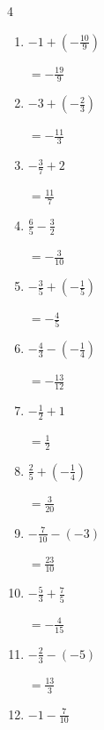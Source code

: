 \begin{multicols}{4}
\begin{enumerate}
        $\displaystyle =\frac{13}{4}$

  \item $\displaystyle -1 + \left(-\frac{10}{9}\right)$

        $\displaystyle =-\frac{19}{9}$

  \item $\displaystyle -3 + \left(-\frac{2}{3}\right)$

        $\displaystyle =-\frac{11}{3}$

  \item $\displaystyle -\frac{3}{7} + 2$

        $\displaystyle =\frac{11}{7}$

  \item $\displaystyle \frac{6}{5} - \frac{3}{2}$

        $\displaystyle =-\frac{3}{10}$

  \item $\displaystyle -\frac{3}{5} + \left(-\frac{1}{5}\right)$

        $\displaystyle =-\frac{4}{5}$

\columnbreak %

  \item $\displaystyle -\frac{4}{3} - \left(-\frac{1}{4}\right)$

        $\displaystyle =-\frac{13}{12}$

  \item $\displaystyle -\frac{1}{2} + 1$

        $\displaystyle =\frac{1}{2}$

  \item $\displaystyle \frac{2}{5} + \left(-\frac{1}{4}\right)$

        $\displaystyle =\frac{3}{20}$

  \item $\displaystyle -\frac{7}{10} - \left(-3\right)$

        $\displaystyle =\frac{23}{10}$

  \item $\displaystyle -\frac{5}{3} + \frac{7}{5}$

        $\displaystyle =-\frac{4}{15}$

  \item $\displaystyle -\frac{2}{3} - \left(-5\right)$

        $\displaystyle =\frac{13}{3}$

  \item $\displaystyle -1 - \frac{7}{10}$


\end{enumerate}
\end{multicols}

